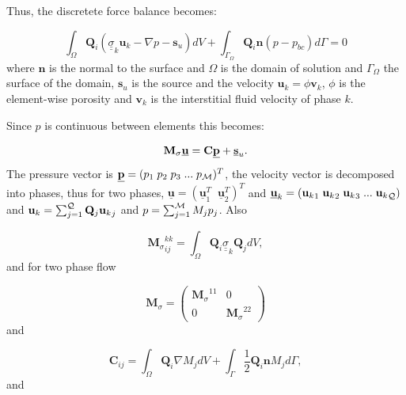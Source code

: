  Thus, the discretete force balance becomes:

\begin{equation}
\int_\Omega {\mathbf Q}_i ({\underline {\underline \sigma}}_k {\mathbf u}_k - \nabla p -{\mathbf s}_u) dV
+  \int_{\Gamma_{\Omega}} {\mathbf Q}_i {\mathbf n} (p - p_{bc}) d\Gamma =0
\label{force-semi-disc}
\end{equation}
where ${\mathbf n}$ is the normal to the surface
and $\Omega$ is the domain of solution and
${\Gamma_{\Omega}}$ the surface of the domain, ${\mathbf s}_u$ is
the source and the velocity ${\mathbf u}_k = \phi {\mathbf v}_k$,
$\phi$ is the
element-wise
porosity and ${\mathbf v}_k$ is the interstitial fluid velocity of phase $k$.

Since $p$ is continuous between elements this becomes:

\begin{equation}
{\mathbf M}_\sigma \underline {\mathbf u} = {\mathbf C} \underline {\bf p}
+ \underline {\bf s}_u.
\label{force-balance-matrix-form}
\end{equation}
The pressure vector is $\underline{\bf p} =(p_1\; p_2 \; p_3\; ...\; p_{\cal M})^T$,
the velocity vector is decomposed into phases, thus for two phases,
$\underline{\mathbf u}=(\underline{\mathbf u}_1^T \;\; \underline{\mathbf u}_2^T)^T$
and $\underline{\mathbf u}_k=({{\mathbf u}_k}_1\; {{\mathbf u}_k}_2\; {{\mathbf u}_k}_3\; ...\; {{\mathbf u}_k}_{\cal Q}) $
and ${\mathbf u}_k = \sum_{j=1}^{\cal Q} {\mathbf Q}_j{{\mathbf u}_k}_j$ and
$p=\sum_{j=1}^{\cal M} M_j{p}_j$. Also


\begin{equation}
{{\mathbf M}_\sigma}^{kk}_{ij} =  \int_\Omega {\mathbf Q}_i
{\underline {\underline \sigma}}_k {\mathbf Q}_j dV,
\end{equation}
and for two phase flow

\begin{equation}
{{\mathbf M}_\sigma} =
  \begin{pmatrix}
    {{\mathbf M}_\sigma}^{11}   & 0 \\
    0   & {{\mathbf M}_\sigma}^{22}
  \end{pmatrix}
\label{m_sigma_matrix}
\end{equation}
and

\begin{equation}
{\mathbf C}_{ij}=\int_\Omega {\mathbf Q}_i \nabla M_j dV
+ \int_\Gamma \frac{1}{2}{\mathbf Q}_i {\mathbf n}  M_j d\Gamma,
\end{equation}
and

